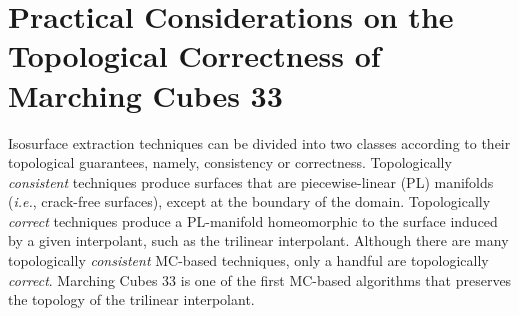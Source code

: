 \chapter{Practical Considerations on the Topological Correctness of Marching Cubes 33}
\label{chap:mc33}

%
%

Isosurface extraction techniques can be divided into two classes according to their topological guarantees, namely, consistency or correctness. Topologically \emph{consistent} techniques produce surfaces that are piecewise-linear (PL) manifolds (\emph{i.e.}, crack-free surfaces), except at the boundary of the domain. Topologically \emph{correct} techniques produce a PL-manifold homeomorphic to the surface induced by a given interpolant, such as the trilinear interpolant. Although there are many topologically \emph{consistent} MC-based techniques, only a handful are topologically \emph{correct}. Marching Cubes 33 is one of the first MC-based algorithms that preserves the topology of the trilinear interpolant.

